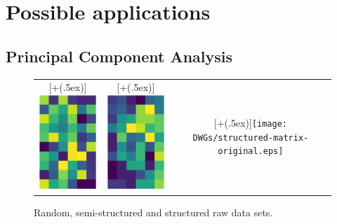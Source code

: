 \documentclass[10pt,twocolumn]{article}
\newcommand*{\addheight}[2][.5ex]{%
  \raisebox{0pt}[\dimexpr\height+(#1)\relax]{#2}%
}
\begin{document}
\section{Possible applications}


\subsection{Principal Component Analysis}

\begin{figure}[H]
\begin{tabular}{ccc}
		\addheight{\includegraphics[width=25mm]{DWGs/random-matrix-original.eps}} &
		\addheight{\includegraphics[width=25mm]{DWGs/semi-structured-matrix-original.eps}} &
		\addheight{\texttt{[image: DWGs/structured-matrix-original.eps]}} \\
\end{tabular}
\caption{Random, semi-structured and structured raw data sets.}	
\end{figure}
\end{document}
